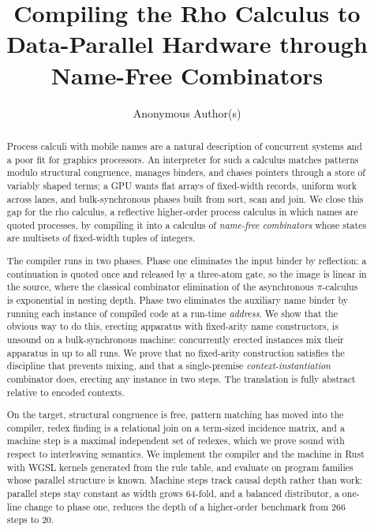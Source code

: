 \documentclass[acmsmall,screen,review,anonymous]{acmart}
\begin{document}
\title{Compiling the Rho Calculus to Data-Parallel Hardware through Name-Free Combinators}

\author{Anonymous Author(s)}

\begin{abstract}
Process calculi with mobile names are a natural description of concurrent
systems and a poor fit for graphics processors. An interpreter for such a
calculus matches patterns modulo structural congruence, manages binders, and
chases pointers through a store of variably shaped terms; a GPU wants flat
arrays of fixed-width records, uniform work across lanes, and bulk-synchronous
phases built from sort, scan and join. We close this gap for the rho calculus,
a reflective higher-order process calculus in which names are quoted
processes, by compiling it into a calculus of \emph{name-free combinators}
whose states are multisets of fixed-width tuples of integers.

The compiler runs in two phases. Phase one eliminates the input binder by
reflection: a continuation is quoted once and released by a three-atom gate,
so the image is linear in the source, where the classical combinator
elimination of the asynchronous $\pi$-calculus is exponential in nesting
depth. Phase two eliminates the auxiliary name binder by running each
instance of compiled code at a run-time \emph{address}. We show that the
obvious way to do this, erecting apparatus with fixed-arity name
constructors, is unsound on a bulk-synchronous machine: concurrently erected
instances mix their apparatus in up to all runs. We prove that no fixed-arity
construction satisfies the discipline that prevents mixing, and that a
single-premise \emph{context-instantiation} combinator does, erecting any
instance in two steps. The translation is fully abstract relative to encoded
contexts.

On the target, structural congruence is free, pattern matching has moved into
the compiler, redex finding is a relational join on a term-sized incidence
matrix, and a machine step is a maximal independent set of redexes, which we
prove sound with respect to interleaving semantics. We implement the compiler
and the machine in Rust with WGSL kernels generated from the rule table, and
evaluate on program families whose parallel structure is known. Machine steps
track causal depth rather than work: parallel steps stay constant as width
grows 64-fold, and a balanced distributor, a one-line change to phase one,
reduces the depth of a higher-order benchmark from 266 steps to 20.
\end{abstract}
\end{document}
